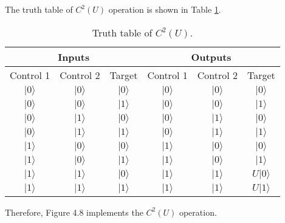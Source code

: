 \documentclass[en]{sol-man}
\begin{document}
\begin{pf}
    The truth table of $C^2(U)$ operation is shown in Table \ref{E4.21-C2U-truth-table}.
    \begin{table}[h]
        \centering
        \caption{Truth table of $C^2(U)$.}
        \label{E4.21-C2U-truth-table}
        \begin{tabular}{|c|c|c|c|c|c|}
        \hline
        \multicolumn{3}{|c|}{Inputs} & \multicolumn{3}{c|}{Outputs} \\ \hline
        Control 1 & Control 2 & Target & Control 1 & Control 2 & Target \\ \hline
        $\lvert 0\rangle$ & $\lvert 0\rangle$ & $\lvert 0\rangle$ & $\lvert 0\rangle$ & $\lvert 0\rangle$ & $\lvert 0\rangle$ \\ \hline
        $\lvert 0\rangle$ & $\lvert 0\rangle$ & $\lvert 1\rangle$ & $\lvert 0\rangle$ & $\lvert 0\rangle$ & $\lvert 1\rangle$ \\ \hline
        $\lvert 0\rangle$ & $\lvert 1\rangle$ & $\lvert 0\rangle$ & $\lvert 0\rangle$ & $\lvert 1\rangle$ & $\lvert 0\rangle$ \\ \hline
        $\lvert 0\rangle$ & $\lvert 1\rangle$ & $\lvert 1\rangle$ & $\lvert 0\rangle$ & $\lvert 1\rangle$ & $\lvert 1\rangle$ \\ \hline
        $\lvert 1\rangle$ & $\lvert 0\rangle$ & $\lvert 0\rangle$ & $\lvert 1\rangle$ & $\lvert 0\rangle$ & $\lvert 0\rangle$ \\ \hline
        $\lvert 1\rangle$ & $\lvert 0\rangle$ & $\lvert 1\rangle$ & $\lvert 1\rangle$ & $\lvert 0\rangle$ & $\lvert 1\rangle$ \\ \hline
        $\lvert 1\rangle$ & $\lvert 1\rangle$ & $\lvert 0\rangle$ & $\lvert 1\rangle$ & $\lvert 1\rangle$ & $U\lvert 0\rangle$ \\ \hline
        $\lvert 1\rangle$ & $\lvert 1\rangle$ & $\lvert 1\rangle$ & $\lvert 1\rangle$ & $\lvert 1\rangle$ & $U\lvert 1\rangle$ \\ \hline
        \end{tabular}
    \end{table}

    Therefore, Figure 4.8 implements the $C^2(U)$ operation.
\end{pf}
\end{document}
